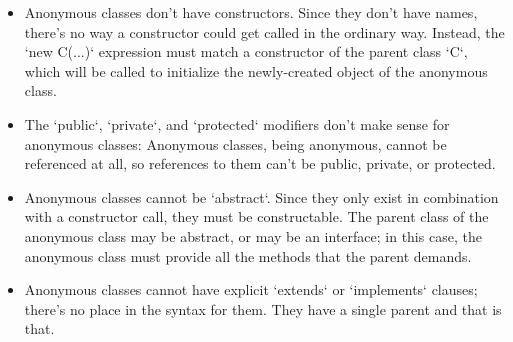 \begin{itemize}

\item Anonymous classes don't have constructors.  Since they don't have names,
      there's no way a constructor could get called in the ordinary way.
      Instead, the \xcd`new C(...)` expression must match a constructor of the
      parent class \xcd`C`, which will be called to initialize the
      newly-created object of the anonymous class.

\item The \xcd`public`,
      \xcd`private`, and \xcd`protected`  modifiers don't make sense for
      anonymous classes:  
      Anonymous classes, being anonymous,
      cannot be referenced at all, so references to them can't be public,
      private, or protected.

\item Anonymous classes cannot be \xcd`abstract`.  Since they only exist in
      combination with a constructor call, they must be constructable.  The
      parent class of the anonymous class may be abstract, or may be an
      interface; in this case, the anonymous class must provide all the
      methods that the parent demands.

\item Anonymous classes cannot have explicit \xcd`extends` or \xcd`implements`
      clauses; there's no place in the syntax for them. They have a single
      parent and that is that. 
\end{itemize}
